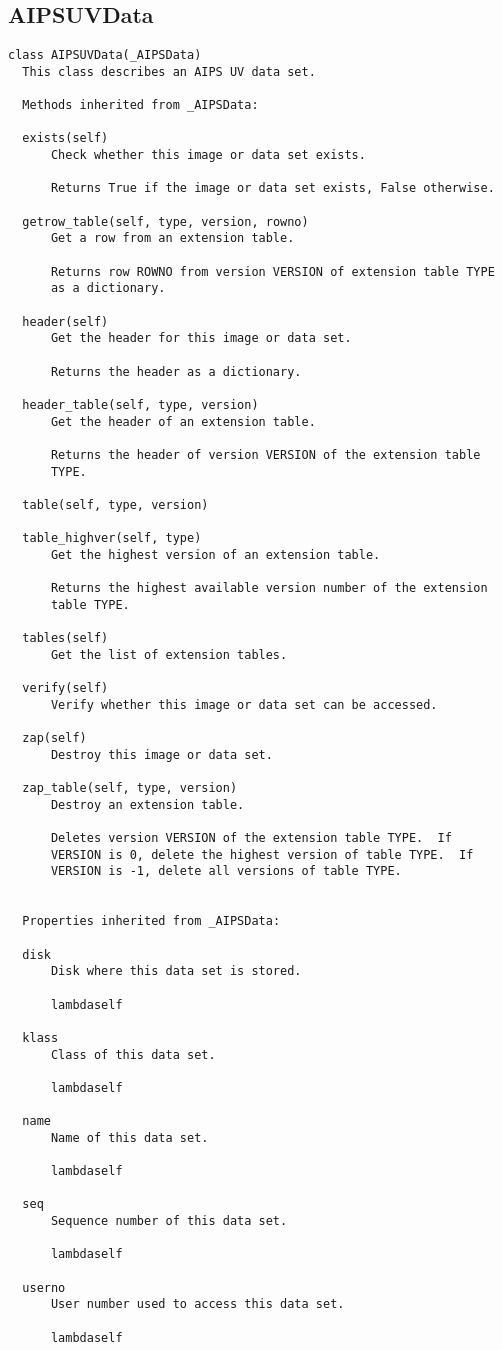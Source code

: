 \documentclass[11pt]{report}
\begin{document}
\subsection{AIPSUVData}
\begin{verbatim}
class AIPSUVData(_AIPSData)
  This class describes an AIPS UV data set.
  
  Methods inherited from _AIPSData:
  
  exists(self)
      Check whether this image or data set exists.
      
      Returns True if the image or data set exists, False otherwise.
  
  getrow_table(self, type, version, rowno)
      Get a row from an extension table.
      
      Returns row ROWNO from version VERSION of extension table TYPE
      as a dictionary.
  
  header(self)
      Get the header for this image or data set.
      
      Returns the header as a dictionary.
  
  header_table(self, type, version)
      Get the header of an extension table.
      
      Returns the header of version VERSION of the extension table
      TYPE.
  
  table(self, type, version)
  
  table_highver(self, type)
      Get the highest version of an extension table.
      
      Returns the highest available version number of the extension
      table TYPE.
  
  tables(self)
      Get the list of extension tables.
  
  verify(self)
      Verify whether this image or data set can be accessed.
  
  zap(self)
      Destroy this image or data set.
 
  zap_table(self, type, version)
      Destroy an extension table.
      
      Deletes version VERSION of the extension table TYPE.  If
      VERSION is 0, delete the highest version of table TYPE.  If
      VERSION is -1, delete all versions of table TYPE.
  

  Properties inherited from _AIPSData:
  
  disk
      Disk where this data set is stored.
  
      lambdaself
  
  klass
      Class of this data set.
  
      lambdaself
  
  name
      Name of this data set.
  
      lambdaself
  
  seq
      Sequence number of this data set.
  
      lambdaself
  
  userno
      User number used to access this data set.
  
      lambdaself
\end{verbatim}
\end{document}

